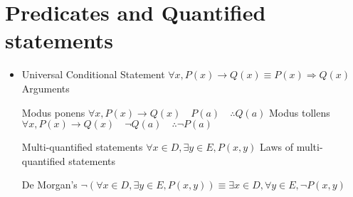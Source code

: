 \section{Predicates and Quantified statements}
\begin{itemize}
\bulletitem Predicate
\begin{itemize}
\bulletitem Domain \( D = \{ 1,2,3,4,5,6,7,8,9 \} = \{1, \ldots ,9\} \)
\bulletitem Set-builder \( \{ x \in D \mid P(x)\} \)
\bulletitem Truth set \( \{ 1, \ldots ,4 \} \)
\end{itemize}
\bulletitem Quantifiers
\begin{itemize}
\bulletitem Universal quantifier \( \forall \)
\bulletitem Existential quantifier \( \exists \)
\end{itemize}
\item Universal Conditional Statement \( \forall x, P(x) \rightarrow Q(x) \equiv P(x) \Rightarrow Q(x) \)
\bulletitem Arguments
\begin{itemize}
\bulletitem Modus ponens \( \forall x, P(x) \rightarrow Q(x) \quad P(a) \quad \therefore Q(a) \)
\bulletitem Modus tollens \( \forall x, P(x) \rightarrow Q(x) \quad \neg Q(a) \quad \therefore \neg P(a) \)
\end{itemize}
\bulletitem Multi-quantified statements \( \forall x \in D, \exists y \in E, P(x,y) \)
\bulletitem Laws of multi-quantified statements
\begin{itemize}
\bulletitem De Morgan's \( \neg ( \forall x \in D, \exists y \in E, P(x,y)) \equiv \exists x \in D, \forall y \in E, \neg P(x,y) \)
\end{itemize}
\end{itemize}
